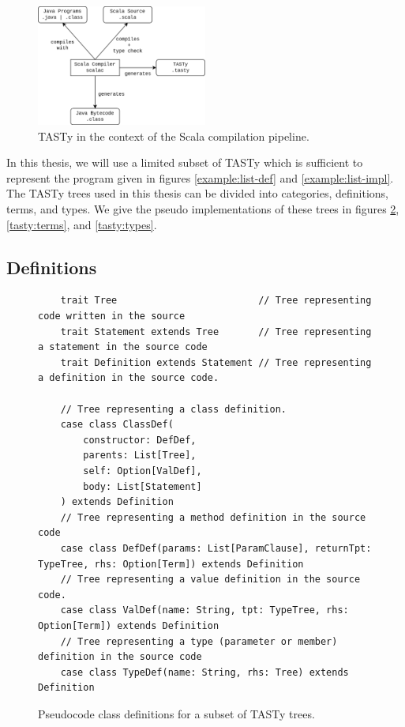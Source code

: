 \begin{figure}[H]
	\centering
	\includegraphics[width=0.5\textwidth]{figures/scala-pipeline.png}
	\caption{TASTy in the context of the Scala compilation pipeline.}
	\label{system:tasty}
\end{figure}

In this thesis, we will use a limited subset of TASTy which is sufficient to represent the program given in figures \ref{example:list-def} and \ref{example:list-impl}.
The TASTy trees used in this thesis can be divided into categories, definitions, terms, and types. 
We give the pseudo implementations of these trees in figures \ref{tasty:defs}, \ref{tasty:terms}, and \ref{tasty:types}.

\subsection{Definitions}

\begin{figure}[!htb]
	\begin{verbatim}
	trait Tree                         // Tree representing code written in the source
	trait Statement extends Tree       // Tree representing a statement in the source code
	trait Definition extends Statement // Tree representing a definition in the source code.
		
	// Tree representing a class definition.
	case class ClassDef(
		constructor: DefDef, 
		parents: List[Tree], 
		self: Option[ValDef], 
		body: List[Statement]
	) extends Definition
	// Tree representing a method definition in the source code
	case class DefDef(params: List[ParamClause], returnTpt: TypeTree, rhs: Option[Term]) extends Definition
	// Tree representing a value definition in the source code.
	case class ValDef(name: String, tpt: TypeTree, rhs: Option[Term]) extends Definition
	// Tree representing a type (parameter or member) definition in the source code
	case class TypeDef(name: String, rhs: Tree) extends Definition
	\end{verbatim} 
	\caption{Pseudocode class definitions for a subset of TASTy trees.}
	\label{tasty:defs}
\end{figure}

